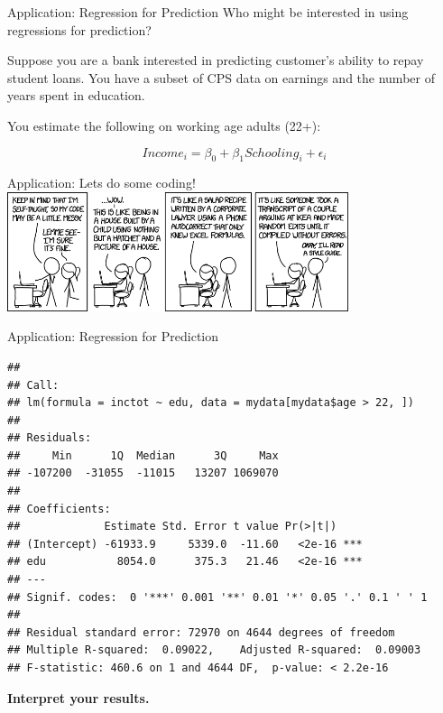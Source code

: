 \documentclass[
  ignorenonframetext,
]{beamer}
\newenvironment{Shaded}{\begin{snugshade}}{\end{snugshade}}
\newcommand{\DecValTok}[1]{\textcolor[rgb]{0.00,0.00,0.81}{#1}}
\newcommand{\FunctionTok}[1]{\textcolor[rgb]{0.00,0.00,0.00}{#1}}
\newcommand{\NormalTok}[1]{#1}
\newcommand{\OtherTok}[1]{\textcolor[rgb]{0.56,0.35,0.01}{#1}}
\newcommand{\SpecialCharTok}[1]{\textcolor[rgb]{0.00,0.00,0.00}{#1}}
\newcommand{\StringTok}[1]{\textcolor[rgb]{0.31,0.60,0.02}{#1}}
\begin{document}
\begin{frame}{Application: Regression for Prediction}
\protect\hypertarget{application-regression-for-prediction}{}
Who might be interested in using regressions for prediction?

Suppose you are a bank interested in predicting customer's ability to
repay student loans. You have a subset of CPS data on earnings and the
number of years spent in education.

You estimate the following on working age adults (22+):

\[
Income_i=\beta_0+\beta_1 Schooling_i+\epsilon_i
\]
\end{frame}

\begin{frame}{Application: Lets do some coding!}
\protect\hypertarget{application-lets-do-some-coding}{}
\center \includegraphics[width=0.75\textwidth,height=\textheight]{"images/code_quality.png"}
\end{frame}

\begin{frame}[fragile]{Application: Regression for Prediction}
\protect\hypertarget{application-regression-for-prediction-1}{}
\tiny

\begin{Shaded}
\end{Shaded}

\begin{verbatim}
## 
## Call:
## lm(formula = inctot ~ edu, data = mydata[mydata$age > 22, ])
## 
## Residuals:
##     Min      1Q  Median      3Q     Max 
## -107200  -31055  -11015   13207 1069070 
## 
## Coefficients:
##             Estimate Std. Error t value Pr(>|t|)    
## (Intercept) -61933.9     5339.0  -11.60   <2e-16 ***
## edu           8054.0      375.3   21.46   <2e-16 ***
## ---
## Signif. codes:  0 '***' 0.001 '**' 0.01 '*' 0.05 '.' 0.1 ' ' 1
## 
## Residual standard error: 72970 on 4644 degrees of freedom
## Multiple R-squared:  0.09022,    Adjusted R-squared:  0.09003 
## F-statistic: 460.6 on 1 and 4644 DF,  p-value: < 2.2e-16
\end{verbatim}

\textbf{Interpret your results.}
\end{frame}
\end{document}
